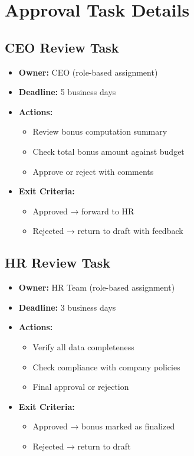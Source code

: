 \documentclass[11pt,a4paper,oneside,openany]{book}
\begin{document}
\section{Approval Task Details}

\subsection{CEO Review Task}

\begin{tcolorbox}[title=CEO Review Process]
\begin{itemize}
    \item \textbf{Owner:} CEO (role-based assignment)
    \item \textbf{Deadline:} 5 business days
    \item \textbf{Actions:}
    \begin{itemize}
        \item Review bonus computation summary
        \item Check total bonus amount against budget
        \item Approve or reject with comments
    \end{itemize}
    \item \textbf{Exit Criteria:}
    \begin{itemize}
        \item Approved → forward to HR
        \item Rejected → return to draft with feedback
    \end{itemize}
\end{itemize}
\end{tcolorbox}

\subsection{HR Review Task}

\begin{tcolorbox}[title=HR Final Approval Process]
\begin{itemize}
    \item \textbf{Owner:} HR Team (role-based assignment)
    \item \textbf{Deadline:} 3 business days
    \item \textbf{Actions:}
    \begin{itemize}
        \item Verify all data completeness
        \item Check compliance with company policies
        \item Final approval or rejection
    \end{itemize}
    \item \textbf{Exit Criteria:}
    \begin{itemize}
        \item Approved → bonus marked as finalized
        \item Rejected → return to draft
    \end{itemize}
\end{itemize}
\end{tcolorbox}
\end{document}
